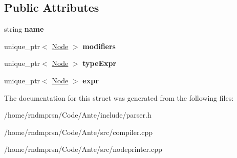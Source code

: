 \subsection*{Public Attributes}
\begin{DoxyCompactItemize}
\item 
\mbox{\label{structLetBindingNode_a6a307137f2337dbe2fff727edf989358}} 
string {\bfseries name}
\item 
\mbox{\label{structLetBindingNode_a176cd5d784f77ba9c3f5c1130aae6e8a}} 
unique\+\_\+ptr$<$ \hyperlink{structNode}{Node} $>$ {\bfseries modifiers}
\item 
\mbox{\label{structLetBindingNode_a227d59829adb37b780cd5ed6481a40ae}} 
unique\+\_\+ptr$<$ \hyperlink{structNode}{Node} $>$ {\bfseries type\+Expr}
\item 
\mbox{\label{structLetBindingNode_a8aa141527747ca7840e40e28f29d91b9}} 
unique\+\_\+ptr$<$ \hyperlink{structNode}{Node} $>$ {\bfseries expr}
\end{DoxyCompactItemize}


The documentation for this struct was generated from the following files\+:\begin{DoxyCompactItemize}
\item 
/home/rndmprsn/\+Code/\+Ante/include/parser.\+h\item 
/home/rndmprsn/\+Code/\+Ante/src/compiler.\+cpp\item 
/home/rndmprsn/\+Code/\+Ante/src/nodeprinter.\+cpp\end{DoxyCompactItemize}
